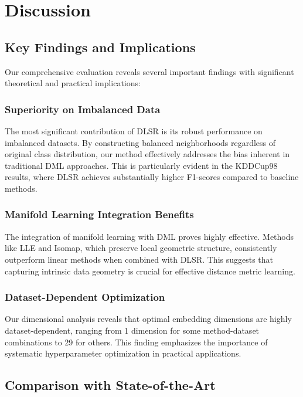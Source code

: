 \documentclass[review]{elsarticle}
\begin{document}
\section{Discussion}
\label{sec:discussion}

\subsection{Key Findings and Implications}

Our comprehensive evaluation reveals several important findings with significant theoretical and practical implications:

\subsubsection{Superiority on Imbalanced Data}

The most significant contribution of DLSR is its robust performance on imbalanced datasets. By constructing balanced neighborhoods regardless of original class distribution, our method effectively addresses the bias inherent in traditional DML approaches. This is particularly evident in the KDDCup98 results, where DLSR achieves substantially higher F1-scores compared to baseline methods.

\subsubsection{Manifold Learning Integration Benefits}

The integration of manifold learning with DML proves highly effective. Methods like LLE and Isomap, which preserve local geometric structure, consistently outperform linear methods when combined with DLSR. This suggests that capturing intrinsic data geometry is crucial for effective distance metric learning.

\subsubsection{Dataset-Dependent Optimization}

Our dimensional analysis reveals that optimal embedding dimensions are highly dataset-dependent, ranging from 1 dimension for some method-dataset combinations to 29 for others. This finding emphasizes the importance of systematic hyperparameter optimization in practical applications.

\subsection{Comparison with State-of-the-Art}
\end{document}
